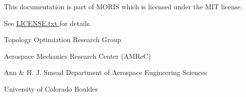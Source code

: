 
\vspace{2.0cm}

\centerline{This documentation is part of MORIS which is licensed under the MIT license. }
\centerline{See \href{https://github.com/kkmaute/moris/blob/main/LICENSE.txt}{LICENSE.txt \ExternalLink} for details.}

\vspace{1.5cm}

\centerline{Topology Optimiation Research Group}
\centerline{Aerospace Mechanics Research Center (AMReC)}
\centerline{Ann \& H. J. Smead Department of Aerospace Engineering Sciences}
\centerline{University of Colorado Boulder}


\newpage
